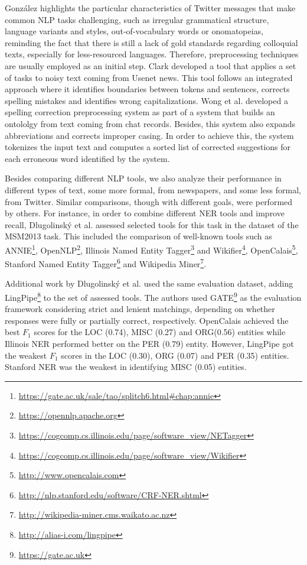 Gonz{\'a}lez \citep{gonzalez2015Colloquialanalysis} highlights the particular characteristics of Twitter messages that make common NLP tasks challenging, such as irregular grammatical structure, language variants and styles, out-of-vocabulary words or onomatopeias, reminding the fact that there is still a lack of gold standards regarding colloquial texts, especially for less-resourced languages. Therefore, preprocessing techniques are usually employed as an initial step. Clark \citep{Clark2003preprocessing} developed a tool that applies a set of tasks to noisy text coming from Usenet news. This tool follows an integrated approach where it identifies boundaries between tokens and sentences, corrects spelling mistakes and identifies wrong capitalizations. Wong et al. \citep{Wong2008Dirtytexts} developed a spelling correction preprocessing system as part of a system that builds an ontololgy from text coming from chat records. Besides, this system also expands abbreviations and corrects improper casing. In order to achieve this, the system tokenizes the input text and computes a sorted list of corrected suggestions for each erroneous word identified by the system.

Besides comparing different NLP tools, we also analyze their performance in different types of text, some more formal, from newspapers, and some less formal, from Twitter. Similar comparisons, though with different goals, were performed by others. For instance, in order to combine different NER tools and improve recall, Dlugolinsk{\'y} et al. \citep{Dlugolinsk2013CombiningNER} assessed selected tools for this task in the dataset of the MSM2013 task.
This included the comparison of well-known tools such as ANNIE\footnote{\url{https://gate.ac.uk/sale/tao/splitch6.html\#chap:annie}}, OpenNLP\footnote{\url{https://opennlp.apache.org}}, Illinois Named Entity Tagger\footnote{\url{https://cogcomp.cs.illinois.edu/page/software_view/NETagger}} and Wikifier\footnote{\url{https://cogcomp.cs.illinois.edu/page/software_view/Wikifier}}, OpenCalais\footnote{\url{http://www.opencalais.com}}, Stanford Named Entity Tagger\footnote{\url{http://nlp.stanford.edu/software/CRF-NER.shtml}} and Wikipedia Miner\footnote{\url{http://wikipedia-miner.cms.waikato.ac.nz}}.

Additional work by Dlugolinsk{\'y} et al. \citep{dlugolinsky2013evaluation} used the same evaluation dataset, adding LingPipe\footnote{\url{http://alias-i.com/lingpipe}} to the set of assessed tools. The authors used GATE\footnote{\url{https://gate.ac.uk}} as the evaluation framework considering strict and lenient matchings, depending on whether responses were fully or partially correct, respectively. OpenCalais achieved the best $F_1$ scores for the LOC (0.74), MISC (0.27) and ORG(0.56) entities while Illinois NER performed better on the PER (0.79) entity. However, LingPipe got the weakest $F_1$ scores in the LOC (0.30), ORG (0.07) and PER (0.35) entities. Stanford NER was the weakest in identifying MISC (0.05) entities.


